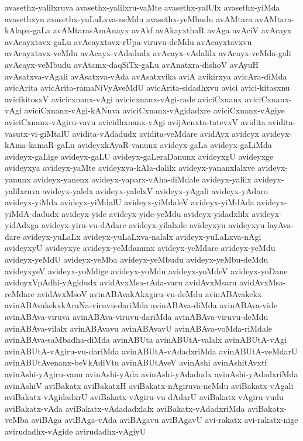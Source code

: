 {avasethx-yalilxruva
avasethx-yalilxru-vaMte
avasethx-yalUlx
avasethx-yiMda
avasethxyu
avasethx-yuLaLxva-neMdu
avasethx-yeMbudu
avAMtara
avAMtara-kAlapx-gaLa
avAMtarasAmAnayx
avAkf
avAkayxthaR
avAga
avAciV
avAcayx
avAcayxtavx-gaLu
avAcayxtavx-rUpa-viruvu-deMdu
avAcayxtavxvu
avAcayxtavx-veMdu
avAcayx-vAdadudx
avAcayx-vAdalilx
avAcayx-veMda-gali
avAcayx-veMbudu
avAtamx-daqSiTx-gaLu
avAnatxra-dishoV
avAyuH
avAsatxva-vAgali
avAsatxva-vAda
avAsatxvika
aviA
avikirxya
avicAra-diMda
avicArita
avicArita-ramaNiVyAveMdU
avicArita-sidadhxvu
avici
avici-kitasxnu
avicikitosxV
avicicxnanx-vAgi
avicicxnanx-vAgi-rade
aviciCxnanx
aviciCxnanx-vAgi
aviciCxnanx-vAgi-kANuva
aviciCxnanx-vAgidadxre
aviciCxnanx-vAgiye
aviciCxnanx-vAgiru-vavu
avicidhxnanx-vAgi
avijAcnxta-tatevxV
avidita
avidita-vasutx-vi-giMtalU
avidita-vAdadudx
avidita-veMdare
avidAyx
avideyx
avideyx-kAma-kamaR-gaLu
avideyxkAyaR-vanunx
avideyx-gaLa
avideyx-gaLiMda
avideyx-gaLige
avideyx-gaLU
avideyx-gaLeraDanunx
avideyxgU
avideyxge
avideyxya
avideyx-yaMte
avideyxya-kAla-dalilx
avideyx-yananxlalxve
avideyx-yanunx
avideyx-yanenx
avideyx-yaparx-vAha-diMdale
avideyx-yalilx
avideyx-yalilxruva
avideyx-yalelx
avideyx-yalelxV
avideyx-yAgali
avideyx-yAdaro
avideyx-yiMda
avideyx-yiMdalU
avideyx-yiMdaleV
avideyx-yiMdAda
avideyx-yiMdA-dadudx
avideyx-yide
avideyx-yide-yeMdu
avideyx-yidadxlilx
avideyx-yidAdxga
avideyx-yiru-vu-dAdare
avideyx-yilalxde
avideyxyu
avideyxyu-layAva-dare
avideyx-yuLaLx
avideyx-yuLaLxva-nalalx
avideyx-yuLaLxva-nAgi
avideyxyU
avideyxye
avideyx-yeMdanunx
avideyx-yeMdare
avideyx-yeMdu
avideyx-yeMdU
avideyx-yeMba
avideyx-yeMbudu
avideyx-yeMbu-deMdu
avideyxyeV
avideyx-yoMdige
avideyx-yoMdu
avideyx-yoMdeV
avideyx-yoDane
avidoyxVpAdhi-yAgidudx
avidAvxMsa-rAda-varu
avidAvxMsaru
avidAvxMsa-reMdare
avidAvxMsoV
avinABAvakAkxgiru-vu-deMdu
avinABAvakekx
avinABAvakekxkAraNa-viruvu-dariMda
avinABAva-diMda
avinABAva-vide
avinABAva-viruva
avinABAva-viruvu-dariMda
avinABAva-viruvu-deMdu
avinABAva-vilalx
avinABAvavu
avinABAvavU
avinABAva-voMda-riMdale
avinABAva-saMbadha-diMda
avinABUta
avinABUtA-valalx
avinABUtA-vAgi
avinABUtA-vAgiru-vu-dariMda
avinABUtA-vAdadxriMda
avinABUtA-veMdarU
avinABUtAvenanx-beVkAdiVtu
avinABUtAveV
avinAshi
avinAshitAvxtf
avinAshi-yAgiru-vanu
avinAshi-yAda
avinAshi-yAdadudx
avinAshi-yAdadxriMda
avinAshiV
aviBakatx
aviBakatxH
aviBakatx-nAgiruva-neMdu
aviBakatx-vAgali
aviBakatx-vAgidadxrU
aviBakatx-vAgiru-vu-dAdarU
aviBakatx-vAgiru-vudu
aviBakatx-vAda
aviBakatx-vAdadadxlalx
aviBakatx-vAdadxriMda
aviBakatx-veMba
aviBAga
aviBAga-vAda
aviBAgavu
aviBAgavU
avi-rakatx
avi-rakatx-nige
avirudadhx-vAgide
avirudadhx-vAgiyU
}
